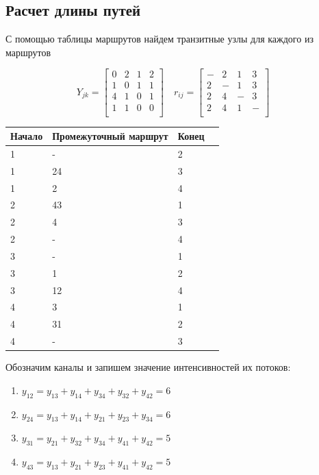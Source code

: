 \documentclass[14pt,a4paper,report]{report}
\begin{document}
\subsection{Расчет длины путей}
С помощью таблицы маршрутов найдем транзитные узлы для каждого из маршрутов

$$Y_{jk} = 
\begin{bmatrix} 
0 & 2 & 1 & 2 \\
1 & 0 & 1 & 1 \\
4 & 1 & 0 & 1 \\
1 & 1 & 0 & 0 \\
\end{bmatrix}
\quad 
r_{ij} = 
\begin{bmatrix} 
- & 2 & 1 & 3 \\
2 & - & 1 & 3 \\
2 & 4 & - & 3 \\
2 & 4 & 1 & - \\
\end{bmatrix}
\quad $$


\begin{table}[h!]
\begin{tabular}{|l|l|l|l|}
\hline
 Начало & Промежуточный маршрут & Конец   \\ \hline
1 & - & 2 \\ \hline
1 & 24 & 3 \\ \hline
1 & 2 & 4 \\ \hline
2 & 43 & 1 \\ \hline
2 & 4 & 3 \\ \hline
2 & - & 4 \\ \hline
3 & - & 1 \\ \hline
3 & 1 & 2 \\ \hline
3 & 12 & 4 \\ \hline
4 & 3 & 1 \\ \hline
4 & 31 & 2 \\ \hline
4 & - & 3 \\ \hline
\end{tabular}%
\end{table}

Обозначим каналы и запишем значение интенсивностей их потоков:

\begin{enumerate}
    \item $y_{12} = y_{13} + y_{14} +  y_{34} +  y_{32}  + y_{42} = 6$
    \item $y_{24} = y_{13} + y_{14} +  y_{21}  + y_{23}  + y_{34} = 6$
    \item $y_{31} = y_{21} + y_{32} +  y_{34}  + y_{41} +  y_{42} = 5$
    \item $y_{43} = y_{13} + y_{21}  + y_{23}  + y_{41} +  y_{42} = 5$
\end{enumerate}
\end{document}
